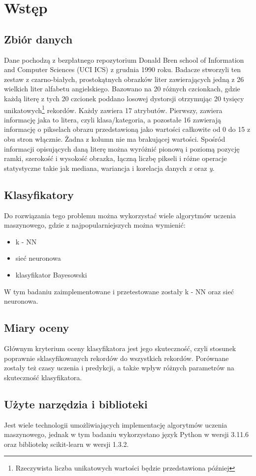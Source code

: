 \section{Wstęp}\label{sec:wstep}

\subsection{Zbiór danych}\label{subsec:zbiordanych}
Dane pochodzą z bezpłatnego repozytorium \cite{misc_letter_recognition_59} Donald Bren school of Information and Computer Sciences (UCI ICS) z grudnia 1990 roku.
Badacze stworzyli ten zestaw z czarno-białych, prostokątnych obrazków liter zawierających jedną z 26 wielkich liter alfabetu angielskiego.
Bazowano na 20 różnych czcionkach, gdzie każdą literę z tych 20 czcionek poddano losowej dystorsji otrzymując 20 tysięcy 
unikatowych\footnote{Rzeczywista liczba unikatowych wartości będzie przedstawiona później} rekordów.
Każdy zawiera 17 atrybutów. Pierwszy, zawiera informację jaka to litera, czyli klasa/kategoria, a pozostałe 16 zawierają informację o pikselach obrazu przedstawioną jako wartości całkowite od 0 do 15 z obu stron włącznie.
Żadna z kolumn nie ma brakującej wartości. Spośród informacji opisujących daną literę można wyróżnić pionową i poziomą pozycję ramki, szerokość i wysokość obrazka, łączną liczbę pikseli i różne operacje statystyczne
takie jak mediana, wariancja i korelacja danych \textit{x} oraz \textit{y}.

\subsection{Klasyfikatory}\label{subsec:klasyfikatory}
Do rozwiązania tego problemu można wykorzystać wiele algorytmów uczenia maszynowego, gdzie z najpopularniejszych można wymienić:
\begin{itemize}
    \item k - NN
    \item sieć neuronowa
    \item klasyfikator Bayesowski
\end{itemize}
W tym badaniu zaimplementowane i przetestowane zostały k - NN oraz sieć neuronowa.

\subsection{Miary oceny}\label{subsec:miaryoceny}
Głównym kryterium oceny klasyfikatora jest jego skuteczność, czyli stosunek poprawnie sklasyfikowanych rekordów do wszystkich rekordów.
Porównane zostały też czasy uczenia i predykcji, a także wpływ różnych parametrów na skuteczność klasyfikatora.

\subsection{Użyte narzędzia i biblioteki}\label{subsec:narzedziaibiblioteki}
Jest wiele technologii umożliwiających implementację algorytmów uczenia maszynowego, jednak w tym badaniu wykorzystano język Python w wersji 3.11.6 oraz bibliotekę scikit-learn w wersji 1.3.2.
